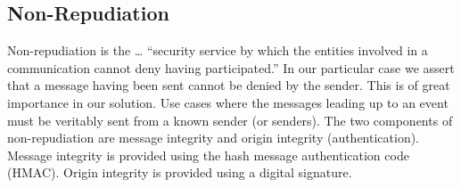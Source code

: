 \subsection{Non-Repudiation}
Non-repudiation is the … “security service by which the entities involved in a communication cannot deny having participated.”\cite{Kissel:2013vu} In our particular case we assert that a message having been sent cannot be denied by the sender. This is of great importance in our solution. Use cases where the messages leading up to an event must be veritably sent from a known sender (or senders). The two components of non-repudiation are message integrity and origin integrity (authentication).  Message integrity is provided using the hash message authentication code (HMAC). Origin integrity is provided using a digital signature. 


